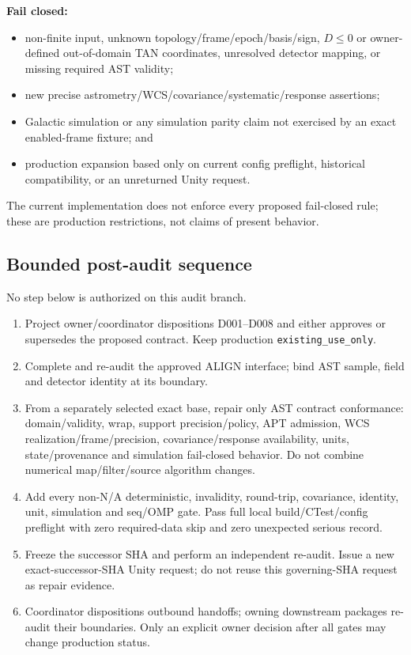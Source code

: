 \documentclass[11pt]{article}
\newcommand{\status}[1]{\nolinkurl{#1}}
\begin{document}
\textbf{Fail closed:}

\begin{itemize}
\item non-finite input, unknown topology/frame/epoch/basis/sign, $D\le0$ or
owner-defined out-of-domain TAN coordinates, unresolved detector mapping, or
missing required AST validity;
\item new precise astrometry/WCS/covariance/systematic/response assertions;
\item Galactic simulation or any simulation parity claim not exercised by an
exact enabled-frame fixture; and
\item production expansion based only on current config preflight, historical
compatibility, or an unreturned Unity request.
\end{itemize}

The current implementation does not enforce every proposed fail-closed rule;
these are production restrictions, not claims of present behavior.

\subsection{Bounded post-audit sequence}

No step below is authorized on this audit branch.

\begin{enumerate}
\item Project owner/coordinator dispositions D001--D008 and either approves or
supersedes the proposed contract. Keep production \status{existing_use_only}.
\item Complete and re-audit the approved ALIGN interface; bind AST sample,
field and detector identity at its boundary.
\item From a separately selected exact base, repair only AST contract
conformance: domain/validity, wrap, support precision/policy, APT admission,
WCS realization/frame/precision, covariance/response availability, units,
state/provenance and simulation fail-closed behavior. Do not combine numerical
map/filter/source algorithm changes.
\item Add every non-N/A deterministic, invalidity, round-trip, covariance,
identity, unit, simulation and seq/OMP gate. Pass full local build/CTest/config
preflight with zero required-data skip and zero unexpected serious record.
\item Freeze the successor SHA and perform an independent re-audit. Issue a
new exact-successor-SHA Unity request; do not reuse this governing-SHA request
as repair evidence.
\item Coordinator dispositions outbound handoffs; owning downstream packages
re-audit their boundaries. Only an explicit owner decision after all gates may
change production status.
\end{enumerate}
\end{document}
